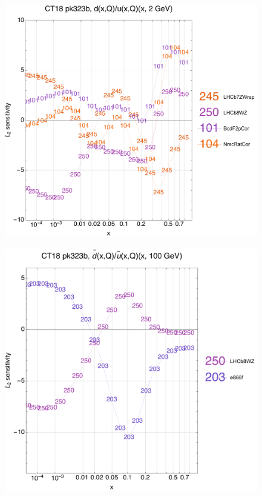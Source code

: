 \documentclass[10pt,aps,prd,floatfix,titlepage]{revtex4}
\begin{document}
\begin{figure}
\includegraphics[width=\textwidth,height=0.44\textheight,keepaspectratio]{2/rat_ifl3_ct18nn_L2_q2_Sf_2.pdf}
\caption{}
\end{figure}
\clearpage
\begin{figure}
\includegraphics[width=\textwidth,height=0.44\textheight,keepaspectratio]{2/rat_ifl4_ct18nn_L2_q100_Sf_2.pdf}
\caption{}
\end{figure}
\end{document}
